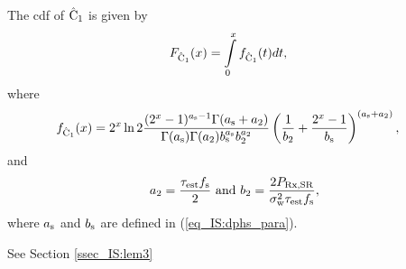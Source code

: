 \begin{lemma} \label{lm_IS:lem3}
\normalfont
The cdf of $\hat{\text{C}}_{\text{1}}$ is given by  
\begin{align}
F_{\hat{\text{C}}_{\text{1}}}(x) &= \int\limits_{0}^{x} f_{\hat{\text{C}}_{\text{1}}}(t) dt, \label{eq_IS:dis_C1} 
\end{align}
where
\begin{align}
f_{\hat{\text{C}}_{\text{1}}}(x) &= 2^x \ln 2 \frac{(2^x - 1)^{a_{\text{s}} - 1} \Gamma(a_{\text{s}} + a_{\text{2}})}{\Gamma(a_{\text{s}}) \Gamma(a_{\text{2}}) b_{\text{s}}^{a_{\text{s}}} b_{\text{2}}^{a_{\text{2}}}} \left(\frac{1}{b_{\text{2}}} + \frac{2^x - 1}{b_{\text{s}}}\right)^{(a_{\text{s}} + a_{\text{2}})}, \label{eq_IS:den_C1}
\end{align}
and 
\begin{align}
\quad & a_{\text{2}} = \frac{\tau_{\text{est}} f_{\text{s}}}{2}  \text{  and  } b_{\text{2}} = \frac{2 P_{\text{Rx,SR}}}{\sigma^2_{\text{w}} \tau_{\text{est}} f_{\text{s}}}, \label{eq_IS:para_p} 
\end{align}
where $a_{\text{s}}$ and $b_{\text{s}}$ are defined in (\ref{eq_IS:dphs_para}). 
\end{lemma} 
\begin{IEEEproof}[Solution]
See Section \ref{ssec_IS:lem3}
\end{IEEEproof}

